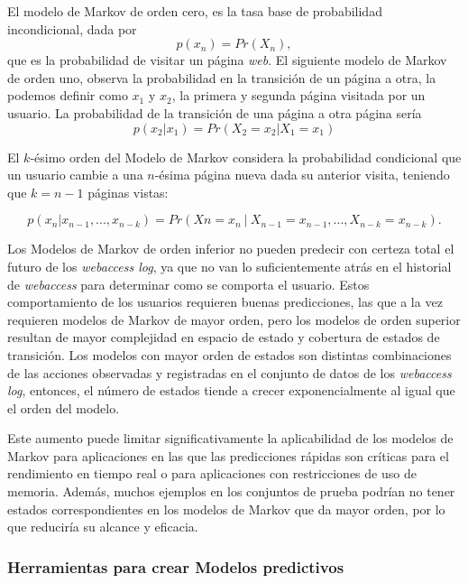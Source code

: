  El modelo de Markov de orden cero, es la tasa base de probabilidad incondicional, dada por \begin{equation}
p(x_n) = Pr(X_n) , \end{equation} que es la probabilidad de visitar un página \emph{web}. El siguiente modelo de Markov de orden uno, observa la probabilidad en la transición de un página a otra, la podemos definir como  $x_{1}$ y $x_{2}$, la primera y segunda página visitada por un usuario. La probabilidad de la transición de una página a otra página sería \begin{equation} 
	 p(x_{2} | x_1) = Pr(X_2 = x_{2} | X_1 = x_{1}) 
 \end{equation}	
 
 El $k$-ésimo orden del Modelo de Markov considera la probabilidad condicional que un usuario cambie a una $n$-ésima página nueva dada su anterior visita, teniendo que $k = n -1$ páginas vistas:

 \begin{equation}\label{eq:tantito}
 \scriptstyle
 p( x_{n} | x_{n-1},..., x_{n-k} ) = Pr(X{n} = x_{n}\ |\ X_{n-1} = x_{n-1},..., X_{n-k} = x_{n-k}) .
 \end{equation}
 
 Los Modelos de Markov de orden inferior no pueden predecir con certeza total el futuro de los \emph{webaccess log}, ya que no van lo suficientemente atrás en el historial de \emph{webaccess} para determinar como se comporta el usuario. Estos comportamiento de los usuarios requieren buenas predicciones, las que a la vez requieren modelos de Markov de mayor orden, pero los modelos de orden superior resultan de mayor complejidad en espacio de estado y cobertura de estados de transición. 
Los modelos con mayor orden de estados son distintas combinaciones de las acciones observadas y registradas en el conjunto de datos de los \emph{webaccess log}, entonces, el número de estados tiende a crecer exponencialmente al igual que el orden del modelo.
 
Este aumento puede limitar significativamente la aplicabilidad de los modelos de Markov para aplicaciones en las que las predicciones rápidas son críticas para el rendimiento en tiempo real o para aplicaciones con restricciones de uso de memoria. Además, muchos ejemplos en los conjuntos de prueba podrían no tener estados correspondientes en los modelos de Markov que da mayor orden, por lo que reduciría su alcance y eficacia.





\subsubsection{Herramientas para crear Modelos predictivos}
